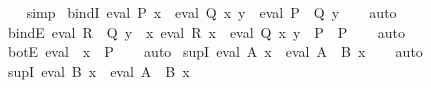 \begin{isabellebody}
%
\isadelimproof
\ \ %
\endisadelimproof
%
\isatagproof
{}\isamarkupfalse%
\ simp%
\endisatagproof
{\isafoldproof}%
%
\isadelimproof
\isanewline
%
\endisadelimproof
\isanewline
{}\isamarkupfalse%
\ bindI{\isacharcolon}{\kern0pt}\ {\isachardoublequoteopen}eval\ P\ x\ {\isasymLongrightarrow}\ eval\ {\isacharparenleft}{\kern0pt}Q\ x{\isacharparenright}{\kern0pt}\ y\ {\isasymLongrightarrow}\ eval\ {\isacharparenleft}{\kern0pt}P\ {\isasymbind}\ Q{\isacharparenright}{\kern0pt}\ y{\isachardoublequoteclose}\isanewline
%
\isadelimproof
\ \ %
\endisadelimproof
%
\isatagproof
{}\isamarkupfalse%
\ auto%
\endisatagproof
{\isafoldproof}%
%
\isadelimproof
\isanewline
%
\endisadelimproof
\isanewline
{}\isamarkupfalse%
\ bindE{\isacharcolon}{\kern0pt}\ {\isachardoublequoteopen}eval\ {\isacharparenleft}{\kern0pt}R\ {\isasymbind}\ Q{\isacharparenright}{\kern0pt}\ y\ {\isasymLongrightarrow}\ {\isacharparenleft}{\kern0pt}{\isasymAnd}x{\isachardot}{\kern0pt}\ eval\ R\ x\ {\isasymLongrightarrow}\ eval\ {\isacharparenleft}{\kern0pt}Q\ x{\isacharparenright}{\kern0pt}\ y\ {\isasymLongrightarrow}\ P{\isacharparenright}{\kern0pt}\ {\isasymLongrightarrow}\ P{\isachardoublequoteclose}\isanewline
%
\isadelimproof
\ \ %
\endisadelimproof
%
\isatagproof
{}\isamarkupfalse%
\ auto%
\endisatagproof
{\isafoldproof}%
%
\isadelimproof
\isanewline
%
\endisadelimproof
\isanewline
{}\isamarkupfalse%
\ botE{\isacharcolon}{\kern0pt}\ {\isachardoublequoteopen}eval\ {\isasymbottom}\ x\ {\isasymLongrightarrow}\ P{\isachardoublequoteclose}\isanewline
%
\isadelimproof
\ \ %
\endisadelimproof
%
\isatagproof
{}\isamarkupfalse%
\ auto%
\endisatagproof
{\isafoldproof}%
%
\isadelimproof
\isanewline
%
\endisadelimproof
\isanewline
{}\isamarkupfalse%
\ supI{}{\isacharcolon}{\kern0pt}\ {\isachardoublequoteopen}eval\ A\ x\ {\isasymLongrightarrow}\ eval\ {\isacharparenleft}{\kern0pt}A\ {\isasymsqunion}\ B{\isacharparenright}{\kern0pt}\ x{\isachardoublequoteclose}\isanewline
%
\isadelimproof
\ \ %
\endisadelimproof
%
\isatagproof
{}\isamarkupfalse%
\ auto%
\endisatagproof
{\isafoldproof}%
%
\isadelimproof
\isanewline
%
\endisadelimproof
\isanewline
{}\isamarkupfalse%
\ supI{}{\isacharcolon}{\kern0pt}\ {\isachardoublequoteopen}eval\ B\ x\ {\isasymLongrightarrow}\ eval\ {\isacharparenleft}{\kern0pt}A\ {\isasymsqunion}\ B{\isacharparenright}{\kern0pt}\ x{\isachardoublequoteclose}\ \isanewline
%
\isadelimproof
\ \ %
\endisadelimproof
%
\isatagproof
{}\isamarkupfalse%

\end{isabellebody}
